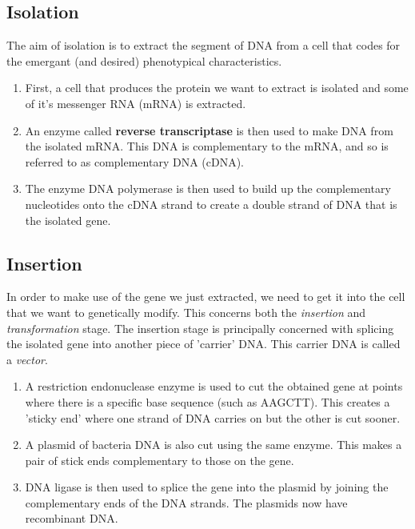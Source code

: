 \documentclass{article}
\begin{document}
\subsection*{Isolation}

The aim of isolation is to extract the segment of DNA from a cell that codes for
the emergant (and desired) phenotypical characteristics.

\begin{enumerate}
	
	\item First, a cell that produces the protein we want to extract is isolated
	and some of it's messenger RNA (mRNA) is extracted.

	\item An enzyme called {\bf reverse transcriptase} is then used to make DNA
	from the isolated mRNA. This DNA is complementary to the mRNA, and so is
	referred to as complementary DNA (cDNA).

	\item The enzyme DNA polymerase is then used to build up the complementary
	nucleotides onto the cDNA strand to create a double strand of DNA that is
	the isolated gene.

\end{enumerate}

\subsection*{Insertion}

In order to make use of the gene we just extracted, we need to get it into the
cell that we want to genetically modify. This concerns both the {\it insertion}
and {\it transformation} stage. The insertion stage is principally concerned
with splicing the isolated gene into another piece of 'carrier' DNA. This
carrier DNA is called a {\it vector}.

\begin{enumerate}
	
	\item A restriction endonuclease enzyme is used to cut the obtained gene at
	points where there is a specific base sequence (such as AAGCTT). This
	creates a 'sticky end' where one strand of DNA carries on but the other is
	cut sooner.

	\item A plasmid of bacteria DNA is also cut using the same enzyme. This
	makes a pair of stick ends complementary to those on the gene.

	\item DNA ligase is then used to splice the gene into the plasmid by joining
	the complementary ends of the DNA strands. The plasmids now have recombinant
	DNA.

\end{enumerate}
\end{document}
